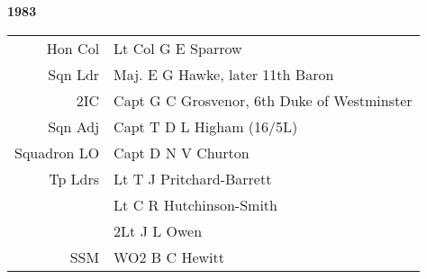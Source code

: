 \begin{center}
  \Huge
  \textbf{1983}
\end{center}

\begin{center}
  \small
  \begin{tabular}{rl}
    Hon Col & Lt Col G E Sparrow \\
    Sqn Ldr & Maj. E G Hawke, later 11th Baron \\
    2IC & Capt G C Grosvenor, 6th Duke of Westminster \\
    Sqn Adj & Capt T D L Higham (16/5L) \\
    Squadron LO & Capt D N V Churton \\
    Tp Ldrs & Lt T J Pritchard-Barrett \\
      & Lt C R Hutchinson-Smith \\
      & 2Lt J L Owen \\
    SSM & WO2 B C Hewitt \\
  \end{tabular}
\end{center}

